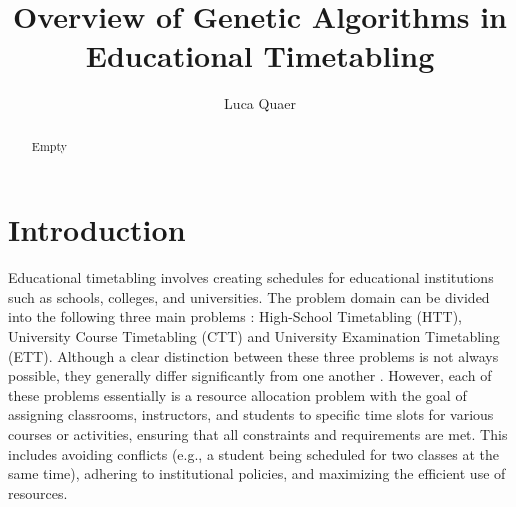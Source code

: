 \documentclass[sigconf]{acmart}
\begin{document}
\title{Overview of Genetic Algorithms in Educational Timetabling}

\author{Luca Quaer}





\begin{abstract}
Empty
\end{abstract}




\maketitle



\section{Introduction}
Educational timetabling involves creating schedules for educational
institutions such as schools, colleges, and universities.
The problem domain can be divided into the following three main problems
\cite{kingston2013educational,schaerf1999survey}:
High-School Timetabling (HTT), University Course Timetabling (CTT) and
University Examination Timetabling (ETT).
Although a clear distinction between these three problems is not always
possible, they generally differ significantly from one another
\cite{Beligiannis2009}.
However, each of these problems essentially is a resource allocation problem
with the goal of assigning classrooms, instructors, and students to specific
time slots for various courses or activities, ensuring that all constraints and
requirements are met.
This includes avoiding conflicts (e.g., a student being scheduled for two
classes at the same time), adhering to institutional policies, and maximizing
the efficient use of resources.
\end{document}
